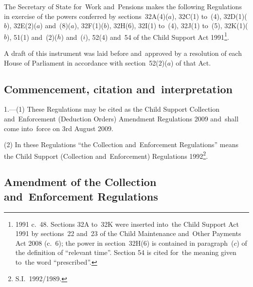 \documentclass[12pt,a4paper]{article}
\title{\regstitle}
\author{S.I.\ 2009 No.\ 1815}
\date{Made
7th July 2009\\
Coming into~force
3rd August 2009
}
\begin{document}
\maketitle

\noindent
The Secretary of State for~Work and~Pensions makes the following Regulations in exercise of the powers conferred by sections~32A(4)($a$), 32C(1) to~(4), 32D(1)($b$), 32E(2)($a$)  and~(8)($a$), 32F(1)($b$), 32H(6), 32I(1) to~(4), 32J(1) to~(5), 32K(1)($b$), 51(1) and~(2)($h$)  and~($i$), 52(4) and~54 of the Child Support Act 1991\footnote{1991 c.~48. Sections 32A to~32K were inserted into~the Child Support Act 1991 by sections~22 and~23 of the Child Maintenance and~Other Payments Act 2008 (c.~6); the power in section~32H(6) is contained in paragraph~($c$)  of the definition of “relevant time”. Section 54 is cited for~the meaning given to~the word “prescribed”.}.

A draft of this instrument was laid before and~approved by a resolution of each House of Parliament in accordance with section~52(2)($a$)  of that Act. 

{\sloppy

\tableofcontents

}

\bigskip

\setcounter{secnumdepth}{-2}

\subsection[1. Commencement, citation and~interpretation]{Commencement, citation and~interpretation}

1.---(1)  These Regulations may be cited as the Child Support Collection and~Enforcement (Deduction Orders) Amendment Regulations 2009 and~shall come into~force on 3rd August 2009.

(2) In these Regulations “the Collection and~Enforcement Regulations” means the Child Support (Collection and~Enforcement) Regulations 1992\footnote{S.I.~1992/1989.}.

\subsection[2. Amendment of the Collection and~Enforcement Regulations]{Amendment of the Collection and~Enforcement Regulations}
\end{document}
